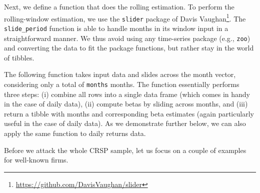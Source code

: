 \documentclass[
]{book}
\newenvironment{Shaded}{\begin{snugshade}}{\end{snugshade}}
\newcommand{\AttributeTok}[1]{\textcolor[rgb]{0.61,0.61,0.61}{#1}}
\newcommand{\ConstantTok}[1]{\textcolor[rgb]{0,0,0}{#1}}
\newcommand{\ControlFlowTok}[1]{\textcolor[rgb]{0.27,0.27,0.27}{\textbf{#1}}}
\newcommand{\DecValTok}[1]{\textcolor[rgb]{0.06,0.06,0.06}{#1}}
\newcommand{\ErrorTok}[1]{\textcolor[rgb]{0.14,0.14,0.14}{\textbf{#1}}}
\newcommand{\FunctionTok}[1]{\textcolor[rgb]{0,0,0}{#1}}
\newcommand{\NormalTok}[1]{#1}
\newcommand{\OtherTok}[1]{\textcolor[rgb]{0.37,0.37,0.37}{#1}}
\newcommand{\SpecialCharTok}[1]{\textcolor[rgb]{0,0,0}{#1}}
\newcommand{\StringTok}[1]{\textcolor[rgb]{0.5,0.5,0.5}{#1}}
\renewcommand{\href}[2]{#2\footnote{\url{#1}}}
\begin{document}
Next, we define a function that does the rolling estimation. To perform the rolling-window estimation, we use the \texttt{slider} package of \href{https://github.com/DavisVaughan/slider}{Davis Vaughan}. The \texttt{slide\_period} function is able to handle months in its window input in a straightforward manner. We thus avoid using any time-series package (e.g., \texttt{zoo}) and converting the data to fit the package functions, but rather stay in the world of tibbles.

The following function takes input data and slides across the month vector, considering only a total of \texttt{months} months. The function essentially performs three steps: (i) combine all rows into a single data frame (which comes in handy in the case of daily data), (ii) compute betas by sliding across months, and (iii) return a tibble with months and corresponding beta estimates (again particularly useful in the case of daily data).
As we demonstrate further below, we can also apply the same function to daily returns data.

\begin{Shaded}
\end{Shaded}

Before we attack the whole CRSP sample, let us focus on a couple of examples for well-known firms.
\end{document}
